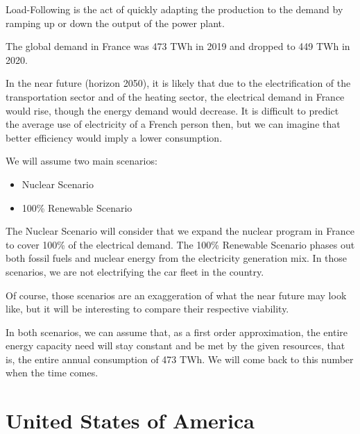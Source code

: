 \begin{kaobox}[frametitle=Load Follow]
Load-Following is the act of quickly adapting the production to the demand by ramping up or down the output of the power plant.
\end{kaobox}

The global demand in France was 473 TWh in 2019 and dropped to 449 TWh in 2020.


In the near future (horizon 2050), it is likely that due to the electrification of the transportation sector and of the heating sector, the electrical demand in France would rise, though the energy demand would decrease. It is difficult to predict the average use of electricity of a French person then, but we can imagine that better efficiency would imply a lower consumption.

We will assume two main scenarios:

\begin{itemize}
	\item Nuclear Scenario
	\item 100\% Renewable Scenario
\end{itemize}

The Nuclear Scenario will consider that we expand the nuclear program in France to cover 100\% of the electrical demand. The 100\% Renewable Scenario phases out both fossil fuels and nuclear energy from the electricity generation mix. In those scenarios, we are not electrifying the car fleet in the country.

Of course, those scenarios are an exaggeration of what the near future may look like, but it will be interesting to compare their respective viability.

In both scenarios, we can assume that, as a first order approximation, the entire energy capacity need will stay constant and be met by the given resources, that is, the entire annual consumption of 473 TWh. We will come back to this number when the time comes.




\section{United States of America}

